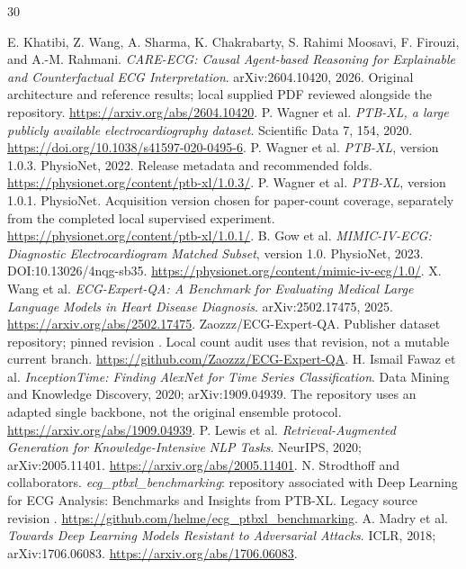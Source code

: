 \clearpage
\begin{thebibliography}{30}
\small
\setlength{\itemsep}{3pt}
 E. Khatibi, Z. Wang, A. Sharma, K. Chakrabarty, S. Rahimi Moosavi, F. Firouzi, and A.-M. Rahmani.
\emph{CARE-ECG: Causal Agent-based Reasoning for Explainable and Counterfactual ECG Interpretation}. arXiv:2604.10420, 2026. Original architecture and reference results; local supplied PDF reviewed alongside the repository. \url{https://arxiv.org/abs/2604.10420}.
 P. Wagner et al. \emph{PTB-XL, a large publicly available electrocardiography dataset}. Scientific Data 7, 154, 2020. \url{https://doi.org/10.1038/s41597-020-0495-6}.
 P. Wagner et al. \emph{PTB-XL}, version 1.0.3. PhysioNet, 2022. Release metadata and recommended folds. \url{https://physionet.org/content/ptb-xl/1.0.3/}.
 P. Wagner et al. \emph{PTB-XL}, version 1.0.1. PhysioNet. Acquisition version chosen for paper-count coverage, separately from the completed local supervised experiment. \url{https://physionet.org/content/ptb-xl/1.0.1/}.
 B. Gow et al. \emph{MIMIC-IV-ECG: Diagnostic Electrocardiogram Matched Subset}, version 1.0. PhysioNet, 2023. DOI:10.13026/4nqg-sb35. \url{https://physionet.org/content/mimic-iv-ecg/1.0/}.
 X. Wang et al. \emph{ECG-Expert-QA: A Benchmark for Evaluating Medical Large Language Models in Heart Disease Diagnosis}. arXiv:2502.17475, 2025. \url{https://arxiv.org/abs/2502.17475}.
 Zaozzz/ECG-Expert-QA. Publisher dataset repository; pinned revision . Local count audit uses that revision, not a mutable current branch. \url{https://github.com/Zaozzz/ECG-Expert-QA}.
 H. Ismail Fawaz et al. \emph{InceptionTime: Finding AlexNet for Time Series Classification}. Data Mining and Knowledge Discovery, 2020; arXiv:1909.04939. The repository uses an adapted single backbone, not the original ensemble protocol. \url{https://arxiv.org/abs/1909.04939}.
 P. Lewis et al. \emph{Retrieval-Augmented Generation for Knowledge-Intensive NLP Tasks}. NeurIPS, 2020; arXiv:2005.11401. \url{https://arxiv.org/abs/2005.11401}.
 N. Strodthoff and collaborators. \emph{ecg\_ptbxl\_benchmarking}: repository associated with Deep Learning for ECG Analysis: Benchmarks and Insights from PTB-XL. Legacy source revision . \url{https://github.com/helme/ecg_ptbxl_benchmarking}.
 A. Madry et al. \emph{Towards Deep Learning Models Resistant to Adversarial Attacks}. ICLR, 2018; arXiv:1706.06083. \url{https://arxiv.org/abs/1706.06083}.

\end{thebibliography}
